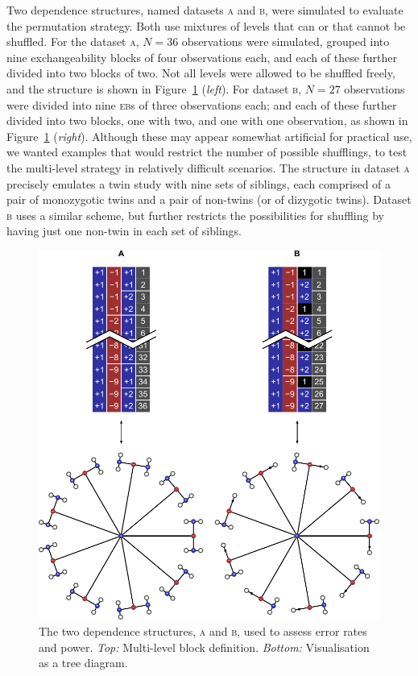 Two dependence structures, named datasets \textsc{a} and \textsc{b}, were simulated to evaluate the permutation strategy. Both use mixtures of levels that can or that cannot be shuffled. For the dataset \textsc{a}, $N=36$ observations were simulated, grouped into nine exchangeability blocks of four observations each, and each of these further divided into two blocks of two. Not all levels were allowed to be shuffled freely, and the structure is shown in Figure~\ref{fig:treesAB} (\emph{left}). For dataset \textsc{b}, $N=27$ observations were divided into nine \textsc{eb}s of three observations each; and each of these further divided into two blocks, one with two, and one with one observation, as shown in Figure~\ref{fig:treesAB} (\emph{right}). Although these may appear somewhat artificial for practical use, we wanted examples that would restrict the number of possible shufflings, to test the multi-level strategy in relatively difficult scenarios. The structure in dataset \textsc{a} precisely emulates a twin study with nine sets of siblings, each comprised of a pair of monozygotic twins and a pair of non-twins (or of dizygotic twins). Dataset \textsc{b} uses a similar scheme, but further restricts the possibilities for shuffling by having just one non-twin in each set of siblings.

\begin{figure}[!p]
\centering
\includegraphics{figures/treesAB.pdf}
\vspace{1cm}
\caption[The two simulated dependence structures used to assess error rates and power.]{The two dependence structures, \textsc{a} and \textsc{b}, used to assess error rates and power.
\emph{Top:} Multi-level block definition.
\emph{Bottom:} Visualisation as a tree diagram.} 
\label{fig:treesAB}
\end{figure}

